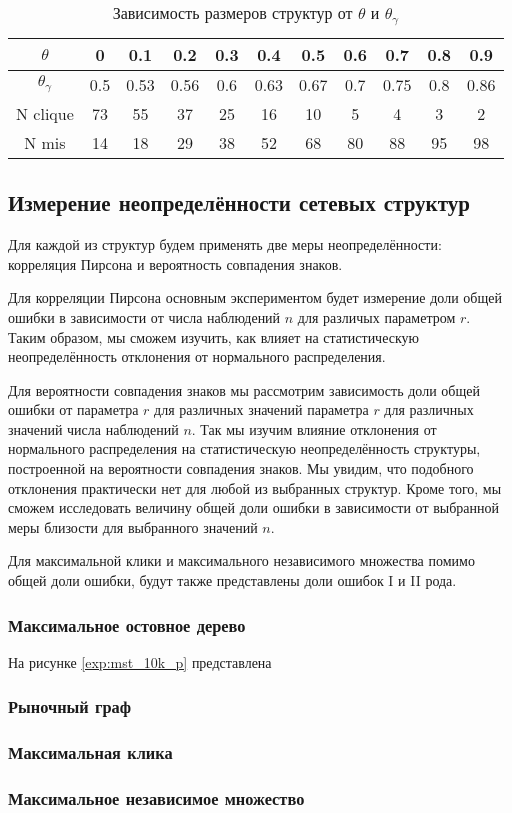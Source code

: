 \begin{table}[h!]
\centering
\begin{tabular}{ |c|c|c|c|c|c|c|c|c|c|c| } 
 \hline
 $\theta$ & 0 & 0.1 & 0.2 & 0.3 & 0.4 & 0.5 & 0.6 & 0.7 & 0.8 & 0.9 \\ 
 \hline
  $\theta_\gamma$ & 0.5 & 0.53 & 0.56 & 0.6 & 0.63 & 0.67 & 0.7 & 0.75 & 0.8 & 0.86 \\ 
 \hline
 N clique & 73 & 55 & 37 & 25 & 16 & 10 & 5 & 4 & 3 & 2\\ 
 \hline
 N mis & 14  & 18 & 29 & 38 & 52 & 68 & 80 & 88 & 95 & 98\\ 
 \hline
\end{tabular}
\caption{Зависимость размеров структур от $\theta$ и $\theta_\gamma$}
\label{table:mis_clique_size_sign}
\end{table}



\subsection{Измерение неопределённости сетевых структур}

Для каждой из структур будем применять две меры неопределённости: корреляция Пирсона и вероятность совпадения знаков.

Для корреляции Пирсона основным экспериментом будет измерение доли общей ошибки в зависимости от числа наблюдений $n$ для различых параметром $r$. Таким образом, мы сможем изучить, как влияет на статистическую неопределённость отклонения от нормального распределения. 

Для вероятности совпадения знаков мы рассмотрим зависимость доли общей ошибки от параметра $r$ для различных значений параметра $r$ для различных значений числа наблюдений $n$. Так мы изучим влияние отклонения от нормального распределения на статистическую неопределённость структуры, построенной на вероятности совпадения знаков. Мы увидим, что подобного отклонения практически нет для любой из выбранных структур. Кроме того, мы сможем исследовать величину общей доли ошибки в зависимости от выбранной меры близости для выбранного значений $n$.

Для максимальной клики и максимального независимого множества помимо общей доли ошибки, будут также представлены доли ошибок I и II рода.

\subsubsection{Максимальное остовное дерево}

На рисунке \ref{exp:mst_10k_p} представлена


\subsubsection{Рыночный граф}
\subsubsection{Максимальная клика}
\subsubsection{Максимальное независимое множество}


